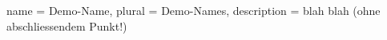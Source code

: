 {
	name = {Demo-Name},
	plural = {Demo-Names},
	description = {blah blah (ohne abschliessendem Punkt!)}
}


